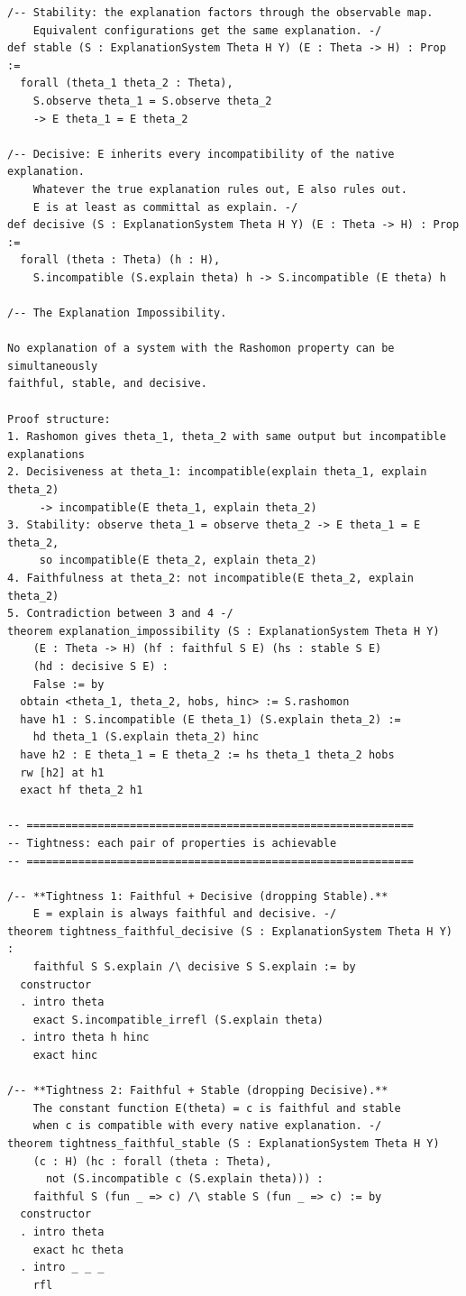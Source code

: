 \documentclass[11pt,a4paper]{article}
\begin{document}
\begin{lstlisting}[caption={ExplanationSystem.lean --- complete file},label={lst:explanation-system}]
/-- Stability: the explanation factors through the observable map.
    Equivalent configurations get the same explanation. -/
def stable (S : ExplanationSystem Theta H Y) (E : Theta -> H) : Prop :=
  forall (theta_1 theta_2 : Theta),
    S.observe theta_1 = S.observe theta_2
    -> E theta_1 = E theta_2

/-- Decisive: E inherits every incompatibility of the native explanation.
    Whatever the true explanation rules out, E also rules out.
    E is at least as committal as explain. -/
def decisive (S : ExplanationSystem Theta H Y) (E : Theta -> H) : Prop :=
  forall (theta : Theta) (h : H),
    S.incompatible (S.explain theta) h -> S.incompatible (E theta) h

/-- The Explanation Impossibility.

No explanation of a system with the Rashomon property can be simultaneously
faithful, stable, and decisive.

Proof structure:
1. Rashomon gives theta_1, theta_2 with same output but incompatible explanations
2. Decisiveness at theta_1: incompatible(explain theta_1, explain theta_2)
     -> incompatible(E theta_1, explain theta_2)
3. Stability: observe theta_1 = observe theta_2 -> E theta_1 = E theta_2,
     so incompatible(E theta_2, explain theta_2)
4. Faithfulness at theta_2: not incompatible(E theta_2, explain theta_2)
5. Contradiction between 3 and 4 -/
theorem explanation_impossibility (S : ExplanationSystem Theta H Y)
    (E : Theta -> H) (hf : faithful S E) (hs : stable S E)
    (hd : decisive S E) :
    False := by
  obtain <theta_1, theta_2, hobs, hinc> := S.rashomon
  have h1 : S.incompatible (E theta_1) (S.explain theta_2) :=
    hd theta_1 (S.explain theta_2) hinc
  have h2 : E theta_1 = E theta_2 := hs theta_1 theta_2 hobs
  rw [h2] at h1
  exact hf theta_2 h1

-- ============================================================
-- Tightness: each pair of properties is achievable
-- ============================================================

/-- **Tightness 1: Faithful + Decisive (dropping Stable).**
    E = explain is always faithful and decisive. -/
theorem tightness_faithful_decisive (S : ExplanationSystem Theta H Y) :
    faithful S S.explain /\ decisive S S.explain := by
  constructor
  . intro theta
    exact S.incompatible_irrefl (S.explain theta)
  . intro theta h hinc
    exact hinc

/-- **Tightness 2: Faithful + Stable (dropping Decisive).**
    The constant function E(theta) = c is faithful and stable
    when c is compatible with every native explanation. -/
theorem tightness_faithful_stable (S : ExplanationSystem Theta H Y)
    (c : H) (hc : forall (theta : Theta),
      not (S.incompatible c (S.explain theta))) :
    faithful S (fun _ => c) /\ stable S (fun _ => c) := by
  constructor
  . intro theta
    exact hc theta
  . intro _ _ _
    rfl


\end{lstlisting}
\end{document}
